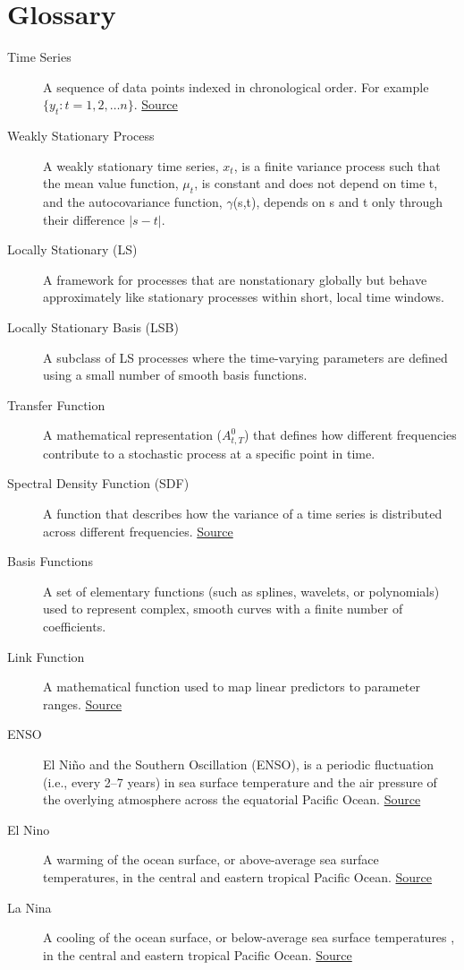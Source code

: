 \documentclass{article}
\begin{document}
\section{Glossary}
\begin{description}
    \item[Time Series] A sequence of data points indexed in chronological order. For example $\{y_t:t=1,2,\ldots n\}$. \href{https://en.wikipedia.org/wiki/Time_series}{Source}
    \item[Weakly Stationary Process]A weakly stationary time series, $x_t$, is a finite variance process such that  the mean value function, $\mu_t$, is constant and does not depend on time t, and the autocovariance function, $\gamma$(s,t), depends on s and t only through their difference $|s-t|$. \cite{shumway2025time}
    \item[Locally Stationary (LS)] A framework for processes that are nonstationary globally but behave approximately like stationary processes within short, local time windows.\cite{dahlhaus1997fitting}
    \item[Locally Stationary Basis (LSB)] A subclass of LS processes where the time-varying parameters are defined using a small number of smooth basis functions. \cite{ganguly2025modeling}
    \item[Transfer Function] A mathematical representation ($A_{t,T}^0$) that defines how different frequencies contribute to a stochastic process at a specific point in time. \cite{ganguly2025modeling}
    \item[Spectral Density Function (SDF)] A function that describes how the variance of a time series is distributed across different frequencies. \href{https://en.wikipedia.org/wiki/Spectral_density}{Source}
    \item[Basis Functions] A set of elementary functions (such as splines, wavelets, or polynomials) used to represent complex, smooth curves with a finite number of coefficients. \cite{ganguly2025modeling}
    \item[Link Function] A mathematical function used to map linear predictors to parameter ranges. \href{https://en.wikipedia.org/wiki/Generalized_linear_model}{Source}
    \item[ENSO] El Niño and the Southern Oscillation (ENSO), is a periodic fluctuation (i.e., every 2–7 years) in sea surface temperature and the air pressure of the overlying atmosphere across the equatorial Pacific Ocean. 
    \href{https://www.ncei.noaa.gov/access/monitoring/enso/}{Source}
    \item[El Nino] A warming of the ocean surface, or above-average sea surface temperatures, in the central and eastern tropical Pacific Ocean. \href{https://www.climate.gov/news-features/blogs/enso/what-el-nino-southern-oscillation-enso-nutshell}{Source}
    \item[La Nina] A cooling of the ocean surface, or below-average sea surface temperatures , in the central and eastern tropical Pacific Ocean. \href{https://www.climate.gov/news-features/blogs/enso/what-el-nino-southern-oscillation-enso-nutshell}{Source}
\end{description}
\end{document}

